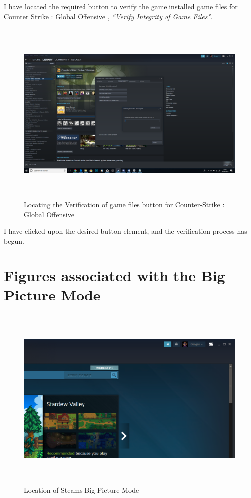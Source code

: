 I have located the required button to verify the game installed game files for Counter Strike : Global Offensive , \textit{``Verify Integrity of Game Files"}. 

\begin{figure}[H]
\includegraphics[width=16cm,height=9cm]{Screenshots/SteamScreenShots/verifyProcess.png}
\caption{Locating the Verification of game files button for Counter-Strike : Global Offensive}    
\end{figure}

I have clicked upon the desired button element, and the verification process has begun.

\section{Figures associated with the Big Picture Mode}
\begin{figure}[H]
\includegraphics[width=16cm,height=9cm]{Screenshots/SteamScreenShots/BigPictureModeTopRightCropped.png}
\caption{Location of Steams Big Picture Mode}    
\end{figure} 

